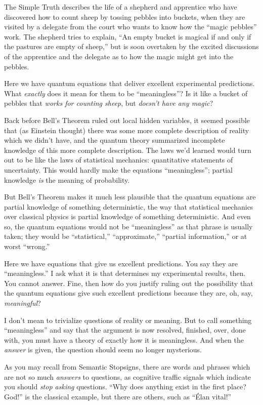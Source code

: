 {
 The Simple Truth describes the life of a shepherd and apprentice
who have discovered how to count sheep by tossing pebbles into buckets,
when they are visited by a delegate from the court who wants to know
how the ``magic pebbles'' work. The
shepherd tries to explain, ``An empty bucket is
magical if and only if the pastures are empty of
sheep,'' but is soon overtaken by the excited
discussions of the apprentice and the delegate as to how the magic
might get into the pebbles.}

{
 Here we have quantum equations that deliver excellent experimental
predictions. What \textit{exactly} does it mean for them to be
``meaningless''? Is it like a bucket
of pebbles that \textit{works for counting sheep}, but
\textit{doesn't have any magic}?}

{
 Back before Bell's Theorem ruled out local hidden
variables, it seemed possible that (as Einstein thought) there was some
more complete description of reality which we didn't
have, and the quantum theory summarized incomplete knowledge of this
more complete description. The laws we'd learned would
turn out to be like the laws of statistical mechanics: quantitative
statements of uncertainty. This would hardly make the equations
``meaningless''; partial knowledge
\textit{is} the meaning of probability.}

{
 But Bell's Theorem makes it much less plausible
that the quantum equations are partial knowledge of something
deterministic, the way that statistical mechanics over classical
physics is partial knowledge of something deterministic. And even so,
the quantum equations would not be
``meaningless'' as that phrase is
usually taken; they would be
``statistical,''
``approximate,''
``partial information,'' or at worst
``wrong.''}

{
 Here we have equations that give us excellent predictions. You say
they are ``meaningless.'' I ask what
it is that determines my experimental results, then. You cannot answer.
Fine, then how do you justify ruling out the possibility that the
quantum equations give such excellent predictions because they are, oh,
say, \textit{meaningful}?}

{
 I don't mean to trivialize questions of reality or
meaning. But to call something
``meaningless'' and say that the
argument is now resolved, finished, over, done with, you must have a
theory of exactly how it is meaningless. And when the \textit{answer}
is given, the question should seem no longer mysterious.}

{
 As you may recall from Semantic Stopsigns, there are words and
phrases which are not so much \textit{answers} to questions, as
cognitive traffic signals which indicate you should \textit{stop
asking} questions. ``Why does anything exist in the
first place? God!'' is the classical example, but
there are others, such as ``Élan
vital!''}

